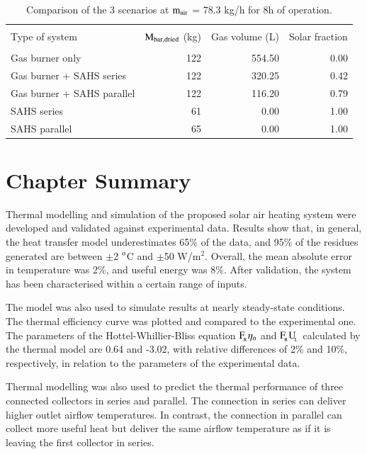 \begin{table}[h]
	\caption{Comparison of the 3 scenarios at $\rm{m_{air}}$ = 78.3 kg/h for 8h of operation. }
	\centering
	
	\begin{tabular}{lrrr}
		\hline \\ [-10pt]
		Type of system & $\rm{M_{bar,dried}}$ (kg) & Gas volume (L) & Solar fraction \\
		\hline \\ [-10pt]
		Gas burner only & 122 & 554.50 & 0.00 \\ [2pt]
		Gas burner + SAHS series & 122 & 320.25 & 0.42 \\ [2pt]
		Gas burner + SAHS parallel & 122 & 116.20 & 0.79 \\ [2pt]
		SAHS series & 61 & 0.00 & 1.00 \\ [2pt] 
		SAHS parallel & 65 & 0.00 & 1.00 \\
		\hline
	\end{tabular}
	
	\label{scenario-comparison}
\end{table}

\section{Chapter Summary}

Thermal modelling and simulation of the proposed solar air heating system were developed and validated against experimental data. Results show that, in general, the heat transfer model underestimates 65\% of the data, and 95\% of the residues generated are between $\pm$2 $^{\rm{o}}$C and $\pm$50 W/m$^2$. Overall, the mean absolute error in temperature was 2\%, and useful energy was 8\%. After validation, the system has been characterised within a certain range of inputs.

The model was also used to simulate results at nearly steady-state conditions. The thermal efficiency curve was plotted and compared to the experimental one. The parameters of the Hottel-Whillier-Bliss equation $\rm{F_{\!_R}}\eta_{\rm{o}}$ and $\rm{ F_{\!_R}{U_{\!_L}}}$ calculated by the thermal model are 0.64 and -3.02, with relative differences of 2\% and 10\%, respectively, in relation to the parameters of the experimental data.

Thermal modelling was also used to predict the thermal performance of three connected collectors in series and parallel. The connection in series can deliver higher outlet airflow temperatures. In contrast, the connection in parallel can collect more useful heat but deliver the same airflow temperature as if it is leaving the first collector in series.

